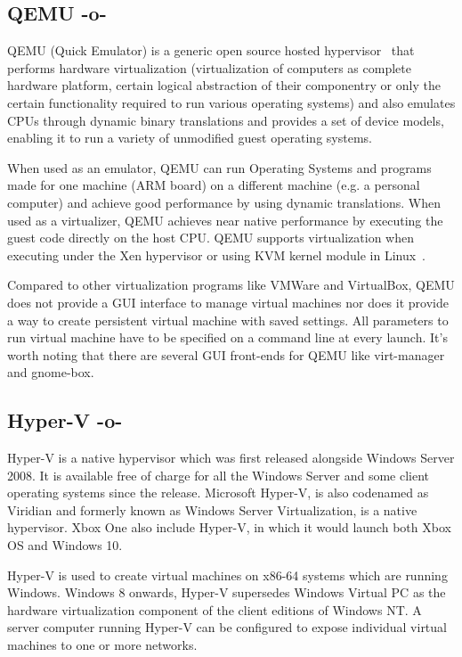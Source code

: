 \subsection{QEMU -o-}
     
QEMU (Quick Emulator) is a generic open source hosted
hypervisor~\cite{www-hypervisor} that performs hardware virtualization
(virtualization of computers as complete hardware platform, certain
logical abstraction of their componentry or only the certain
functionality required to run various operating systems)
\cite{www-qemu} and also emulates CPUs through dynamic binary
translations and provides a set of device models, enabling it to run a
variety of unmodified guest operating systems.
     
When used as an emulator, QEMU can run Operating Systems and programs
made for one machine (ARM board) on a different machine (e.g. a
personal computer) and achieve good performance by using dynamic
translations.  When used as a virtualizer, QEMU achieves near native
performance by executing the guest code directly on the host CPU. QEMU
supports virtualization when executing under the Xen hypervisor or
using KVM kernel module in Linux~\cite{www-qemuwiki}.

     Compared to other virtualization programs like VMWare and VirtualBox,
     QEMU does not provide a GUI interface to manage virtual machines nor
     does it provide a way to create persistent virtual machine with saved
     settings. All parameters to run virtual machine have to be specified
     on a command line at every launch. It's worth noting that there are
     several GUI front-ends for QEMU like virt-manager and gnome-box.

     \pv

\subsection{Hyper-V -o-}
     
Hyper-V is a native hypervisor which was first released alongside
Windows Server 2008. It is available free of charge for all the
Windows Server and some client operating systems since the
release. Microsoft Hyper-V, is also codenamed as Viridian and formerly
known as Windows Server Virtualization, is a native hypervisor. Xbox
One also include Hyper-V, in which it would launch both Xbox OS and
Windows 10.~\cite{www-hyper-v-wikipedia}

     Hyper-V is used to create virtual machines on x86-64 systems
     which are running Windows. Windows 8 onwards, Hyper-V supersedes
     Windows Virtual PC as the hardware virtualization component of
     the client editions of Windows NT. A server computer running
     Hyper-V can be configured to expose individual virtual machines
     to one or more networks.

